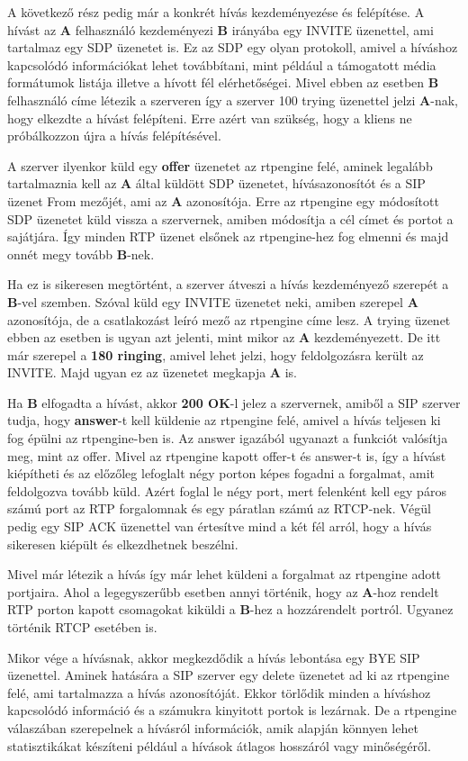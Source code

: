 A következő rész pedig már a konkrét hívás kezdeményezése és felépítése. A hívást az 
\textbf{A} felhasználó kezdeményezi \textbf{B} irányába egy INVITE üzenettel, ami tartalmaz
egy SDP üzenetet is. Ez az SDP egy olyan protokoll, amivel a híváshoz kapcsolódó információkat
lehet továbbítani, mint például a támogatott média formátumok listája illetve a hívott fél
elérhetőségei. Mivel ebben az esetben \textbf{B} felhasználó címe létezik a szerveren így
a szerver 100 trying üzenettel jelzi \textbf{A}-nak, hogy elkezdte a hívást felépíteni. Erre
azért van szükség, hogy a kliens ne próbálkozzon újra a hívás felépítésével.

A szerver ilyenkor küld egy \textbf{offer} üzenetet az rtpengine felé, aminek legalább 
tartalmaznia kell az \textbf{A} által küldött SDP üzenetet, hívásazonosítót és a SIP üzenet
From mezőjét, ami az \textbf{A} azonosítója. Erre az rtpengine egy módosított SDP üzenetet küld
vissza a szervernek, amiben módosítja a cél címet és portot a sajátjára. Így minden RTP
üzenet elsőnek az rtpengine-hez fog elmenni és majd onnét megy tovább \textbf{B}-nek.

Ha ez is sikeresen megtörtént, a szerver átveszi a hívás kezdeményező szerepét a \textbf{B}-vel
szemben. Szóval küld egy INVITE üzenetet neki, amiben szerepel \textbf{A} azonosítója, de
a csatlakozást leíró mező az rtpengine címe lesz. A trying üzenet ebben az esetben is 
ugyan azt jelenti, mint mikor az \textbf{A} kezdeményezett. De itt már szerepel a 
\textbf{180 ringing}, amivel lehet jelzi, hogy feldolgozásra került az INVITE. Majd ugyan ez 
az üzenetet megkapja \textbf{A} is. 

Ha \textbf{B} elfogadta a hívást, akkor \textbf{200 OK}-l jelez a szervernek, amiből a
SIP szerver tudja, hogy \textbf{answer}-t kell küldenie az rtpengine felé, amivel a hívás teljesen
ki fog épülni az rtpengine-ben is. Az answer igazából ugyanazt a funkciót valósítja meg,
mint az offer. Mivel az rtpengine kapott offer-t és answer-t is, így a hívást kiépítheti
és az előzőleg lefoglalt négy porton képes fogadni a forgalmat, amit feldolgozva 
tovább küld. Azért foglal le négy port, mert felenként kell egy páros számú port az 
RTP forgalomnak és egy páratlan számú az RTCP-nek. Végül pedig egy SIP ACK üzenettel van
értesítve mind a két fél arról, hogy a hívás sikeresen kiépült és elkezdhetnek 
beszélni. 

Mivel már létezik a hívás így már lehet küldeni a forgalmat az rtpengine adott 
portjaira. Ahol a legegyszerűbb esetben annyi történik, hogy az \textbf{A}-hoz rendelt
RTP porton kapott csomagokat kiküldi a \textbf{B}-hez a hozzárendelt portról. Ugyanez
történik RTCP esetében is. 

Mikor vége a hívásnak, akkor megkezdődik a hívás lebontása egy BYE SIP üzenettel. Aminek
hatására a SIP szerver egy delete üzenetet ad ki az rtpengine felé, ami tartalmazza a hívás
azonosítóját. Ekkor törlődik minden a híváshoz kapcsolódó információ és a számukra kinyitott
portok is lezárnak. De a rtpengine válaszában szerepelnek a hívásról információk, amik alapján
könnyen lehet statisztikákat készíteni például a hívások átlagos hosszáról vagy minőségéről.